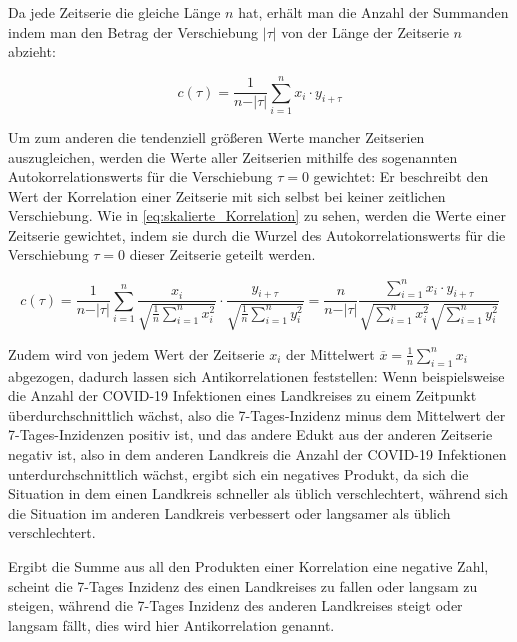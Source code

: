 Da jede Zeitserie die gleiche Länge $n$ hat, erhält man die Anzahl der Summanden indem man
den Betrag der Verschiebung $\vert\tau\vert$
von der Länge der Zeitserie $n$ abzieht:

\begin{equation}\label{eq:skalierte_Korrelation_geteilt_durch_Produkte}
    c(\tau) =\frac{1}{n-\vert\tau\vert} \sum_{i=1}^n x_i\cdot y_{i+\tau}
\end{equation}

Um zum anderen die tendenziell größeren Werte mancher Zeitserien auszugleichen, werden die Werte aller Zeitserien mithilfe des sogenannten \glqq{}Autokorrelationswerts für die Verschiebung $\tau=0$ \grqq{} gewichtet: Er beschreibt den Wert der Korrelation einer Zeitserie mit sich selbst bei keiner zeitlichen Verschiebung. Wie in \autoref{eq:skalierte_Korrelation} zu sehen, werden die Werte einer Zeitserie gewichtet, indem sie durch die Wurzel des Autokorrelationswerts für die Verschiebung $\tau=0$ dieser Zeitserie geteilt werden.

\begin{equation}\label{eq:skalierte_Korrelation}
    c(\tau) =
    \frac{1}{n-\vert\tau\vert}
    \sum_{i=1}^n
    \frac{x_i}{\sqrt{\frac{1}{n}\sum_{i=1}^n x_i^2}}
    \cdot
    \frac{y_{i+\tau}}{\sqrt{\frac{1}{n}\sum_{i=1}^n y_i^2}}
    =
    \frac{n}{n-\vert\tau\vert}
    \frac{\sum_{i=1}^n x_i \cdot y_{i+\tau}}
    {\sqrt{\sum_{i=1}^n x_i^2}
    \sqrt{\sum_{i=1}^n y_i^2}}
\end{equation}


Zudem wird von jedem Wert der Zeitserie $x_i$ der Mittelwert $\overline x = \frac{1}{n}\sum_{i=1}^n x_i$ abgezogen, dadurch lassen sich Antikorrelationen feststellen: Wenn beispielsweise die Anzahl der COVID-19 Infektionen eines Landkreises zu einem Zeitpunkt überdurchschnittlich wächst, also die 7-Tages-Inzidenz minus dem Mittelwert der 7-Tages-Inzidenzen positiv ist, und das andere Edukt aus der anderen Zeitserie negativ ist, also in dem anderen Landkreis die Anzahl der COVID-19 Infektionen unterdurchschnittlich wächst, ergibt sich ein negatives Produkt, da sich die Situation in dem einen Landkreis  schneller als üblich verschlechtert, während sich die Situation im anderen Landkreis verbessert oder langsamer als üblich verschlechtert.

Ergibt die Summe aus all den Produkten einer Korrelation eine negative Zahl, scheint die 7-Tages Inzidenz des einen Landkreises zu fallen oder langsam zu steigen, während die 7-Tages Inzidenz des anderen Landkreises steigt oder langsam fällt, dies wird hier Antikorrelation genannt.

